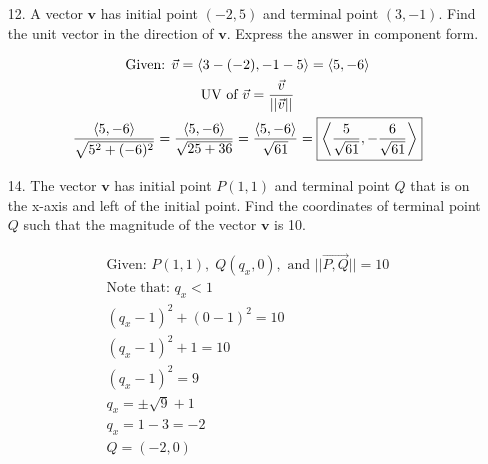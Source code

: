 \documentclass[10pt, letterpaper]{article}
\begin{document}
\begin{itemize}
        \item [12.] A vector $\mathbf{v}$ has initial point $(-2, 5)$ and terminal point $(3, -1)$. Find the unit vector in the direction of $\mathbf{v}$. Express the answer in component form. \\
        
        \begin{mdframed}
            \begin{equation*}
                \begin{gathered}
                    \text{Given: } \vec{v} = \expval{3 - (-2), -1 - 5} = \expval{5, -6}    \\
                    \text{UV of } \vec{v} = \frac{\vec{v}}{||\vec{v}||}                     \\
                    \frac{\expval{5, -6}}{\sqrt{5^2 + (-6)^2}} 
                    = \frac{\expval{5, -6}}{\sqrt{25 + 36}}
                    = \frac{\expval{5, -6}}{\sqrt{61}} 
                    = \boxed{\expval{\frac{5}{\sqrt{61}}, -\frac{6}{\sqrt{61}}}}
                \end{gathered}
            \end{equation*}
        \end{mdframed}

        \item [14.] The vector $\mathbf{v}$ has initial point $P(1, 1)$ and terminal point $Q$ that is on the x-axis and left of the initial point. Find the coordinates of terminal point $Q$ such that the magnitude of the vector $\mathbf{v}$ is 10. \\
        
        \begin{mdframed}
            \begin{equation*}
                \begin{gathered}
                    \text{Given: } P(1, 1),\; Q(q_{x}, 0), 
                    \text{ and } ||\vec{P, Q}|| = 10        \\
                    \text{Note that: } q_{x} < 1            \\
                    (q_{x} - 1)^2 + (0 - 1)^2 = 10          \\
                    (q_{x} - 1)^2 + 1 = 10                  \\
                    (q_{x} - 1)^2 = 9                       \\
                    q_{x} = \pm \sqrt{9} + 1                \\
                    q_{x} = 1 - 3 = -2                      \\
                    \boxed{Q = (-2, 0)}
                \end{gathered}
            \end{equation*}
        \end{mdframed}


\end{itemize}
\end{document}
